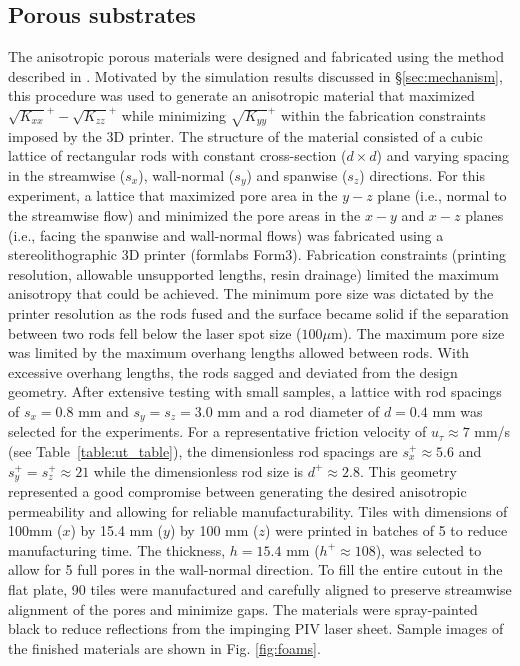 \documentclass[letterpaper,11pt]{article}
\newcommand{\kpxx}{\sqrt{K_{xx}}^+}
\newcommand{\kpyy}{\sqrt{K_{yy}}^+}
\newcommand{\kpzz}{\sqrt{K_{zz}}^+}
\begin{document}
\subsection{Porous substrates}\label{sec:foams}
The anisotropic porous materials were designed and fabricated using the method described in \citet{chavarin2020resolventbased}. Motivated by the simulation results discussed in \S\ref{sec:mechanism}, this procedure was used to generate an anisotropic material that maximized $\kpxx - \kpzz$ while minimizing $\kpyy$ within the fabrication constraints imposed by the 3D printer. The structure of the material consisted of a cubic lattice of rectangular rods with constant cross-section ($d \times d$) and varying spacing in the streamwise ($s_x$), wall-normal ($s_y$) and spanwise ($s_z$) directions. For this experiment, a lattice that maximized pore area in the $y-z$ plane (i.e., normal to the streamwise flow) and minimized the pore areas in the $x-y$ and $x-z$ planes (i.e., facing the spanwise and wall-normal flows) was fabricated using a stereolithographic 3D printer (formlabs Form3). Fabrication constraints (printing resolution, allowable unsupported lengths, resin drainage) limited the maximum anisotropy that could be achieved. %
The minimum pore size was dictated by the printer resolution as the rods fused and the surface became solid if the separation between two rods fell below the laser spot size ($100\mu$m). The maximum pore size was limited by the maximum overhang lengths allowed between rods.  With excessive overhang lengths, the rods sagged and deviated from the design geometry. 
After extensive testing with small samples, a lattice with rod spacings of $s_x = 0.8$ mm and $s_y = s_z = 3.0$ mm and a rod diameter of $d=0.4$ mm was selected for the experiments.  For a representative friction velocity of $u_\tau \approx 7$ mm/s (see Table~\ref{table:ut_table}), the dimensionless rod spacings are $s_x^+ \approx 5.6$ and $s_y^+ = s_z^+ \approx 21$ while the dimensionless rod size is $d^+ \approx 2.8$. This geometry represented a good compromise between generating the desired anisotropic permeability and allowing for reliable manufacturability. Tiles with dimensions of 100mm ($x$) by 15.4 mm ($y$) by 100 mm ($z$) were printed in batches of 5 to reduce manufacturing time. The thickness, $h=15.4$ mm ($h^+ \approx 108$), was selected to allow for 5 full pores in the wall-normal direction. To fill the entire cutout in the flat plate, 90 tiles were manufactured and carefully aligned to preserve streamwise alignment of the pores and minimize gaps. The materials were spray-painted black to reduce reflections from the impinging PIV laser sheet. Sample images of the finished materials are shown in Fig. \ref{fig:foams}. 
\end{document}
